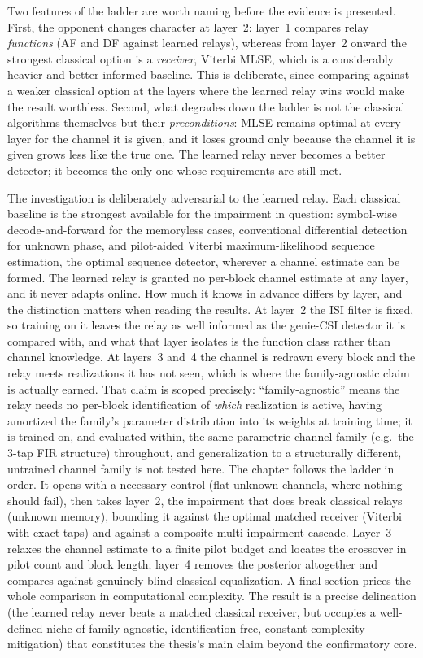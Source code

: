 Two features of the ladder are worth naming before the evidence is presented. First, the opponent changes character at layer~2: layer~1 compares relay \emph{functions} (AF and DF against learned relays), whereas from layer~2 onward the strongest classical option is a \emph{receiver}, Viterbi MLSE, which is a considerably heavier and better-informed baseline. This is deliberate, since comparing against a weaker classical option at the layers where the learned relay wins would make the result worthless. Second, what degrades down the ladder is not the classical algorithms themselves but their \emph{preconditions}: MLSE remains optimal at every layer for the channel it is given, and it loses ground only because the channel it is given grows less like the true one. The learned relay never becomes a better detector; it becomes the only one whose requirements are still met.

The investigation is deliberately adversarial to the learned relay. Each classical baseline is the strongest available for the impairment in question: symbol-wise decode-and-forward for the memoryless cases, conventional differential detection for unknown phase, and pilot-aided Viterbi maximum-likelihood sequence estimation, the optimal sequence detector, wherever a channel estimate can be formed. The learned relay is granted no per-block channel estimate at any layer, and it never adapts online. How much it knows in advance differs by layer, and the distinction matters when reading the results. At layer~2 the ISI filter is fixed, so training on it leaves the relay as well informed as the genie-CSI detector it is compared with, and what that layer isolates is the function class rather than channel knowledge. At layers~3 and~4 the channel is redrawn every block and the relay meets realizations it has not seen, which is where the family-agnostic claim is actually earned. That claim is scoped precisely: ``family-agnostic'' means the relay needs no per-block identification of \emph{which} realization is active, having amortized the family's parameter distribution into its weights at training time; it is trained on, and evaluated within, the same parametric channel family (e.g.\ the 3-tap FIR structure) throughout, and generalization to a structurally different, untrained channel family is not tested here. The chapter follows the ladder in order. It opens with a necessary control (flat unknown channels, where nothing should fail), then takes layer~2, the impairment that does break classical relays (unknown memory), bounding it against the optimal matched receiver (Viterbi with exact taps) and against a composite multi-impairment cascade. Layer~3 relaxes the channel estimate to a finite pilot budget and locates the crossover in pilot count and block length; layer~4 removes the posterior altogether and compares against genuinely blind classical equalization. A final section prices the whole comparison in computational complexity. The result is a precise delineation (the learned relay never beats a matched classical receiver, but occupies a well-defined niche of family-agnostic, identification-free, constant-complexity mitigation) that constitutes the thesis's main claim beyond the confirmatory core.

